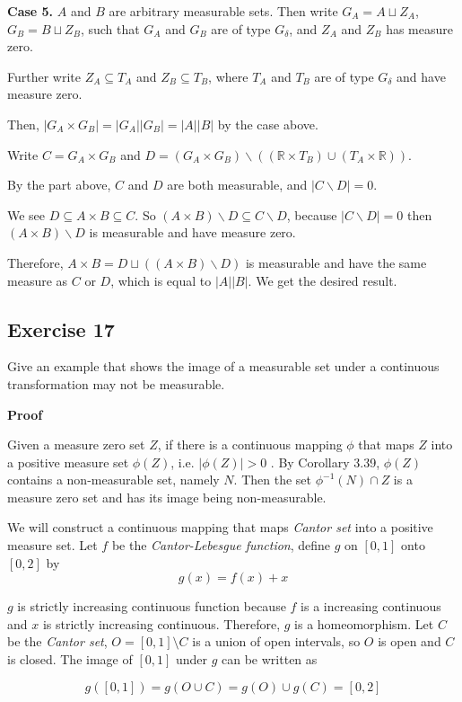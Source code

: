 \documentclass{article}
\begin{document}
\textbf{Case 5.} $A$ and $B$ are arbitrary measurable sets. Then write $G_A = A ⊔ Z_A$, $G_B = B ⊔ Z_B$, such that $G_A$ and $G_B$ are of type $G_δ$, and $Z_A$ and $Z_B$ has measure zero.

Further write $Z_A  ⊆ T_A$ and $Z_B ⊆ T_B$, where $T_A$ and $T_B$ are of type $G_δ$ and have measure zero.

Then, $|G_A × G_B| = |G_A||G_B|=|A||B|$ by the case above.

Write $C=G_A × G_B$ and $D=(G_A × G_B) ∖ ((ℝ × T_B) ∪(T_A × ℝ))$.

By the part above, $C$ and $D$ are both measurable, and $|C ∖ D|=0$.

We see $D ⊆ A × B ⊆ C$. So $(A × B) ∖ D ⊆ C ∖ D$, because $|C ∖ D|=0$ then $(A × B) ∖ D$ is measurable and have measure zero.

Therefore, $A × B = D ⊔ ((A × B) ∖ D)$ is measurable and have the same measure as $C$ or $D$, which is equal to $|A||B|$. We get the desired result.

\subsection{Exercise 17} %

Give an example that shows the image of a measurable set under a continuous transformation may not be measurable.

\textbf{Proof}

Given a measure zero set $Z$, if there is a continuous mapping $\phi$ that maps $Z$ into a positive measure set $\phi(Z)$, i.e. $|\phi(Z)| > 0$%
. By Corollary 3.39, $\phi(Z)$ contains a non-measurable set, namely $N$. Then the set $\phi^{-1}(N) \cap Z$ is a measure zero set and has its image being non-measurable.

We will construct a continuous mapping that maps \emph{Cantor set} into a positive measure set.
Let $f$ be the \emph{Cantor-Lebesgue function}, define $g$ on $[0, 1]$ onto $[0, 2]$ by
\[
    g(x) = f(x) + x
\]

$g$ is strictly increasing continuous function because $f$ is a increasing continuous and $x$ is strictly increasing continuous. Therefore, $g$ is a homeomorphism. Let $C$ be the \emph{Cantor set}, $O = [0, 1] \setminus C$ is a union of open intervals, so $O$ is open and $C$ is closed. The image of $[0, 1]$ under $g$ can be written as

$$
    g([0, 1]) = g(O \cup  C) = g(O) \cup g(C) = [0, 2]
$$
\end{document}
